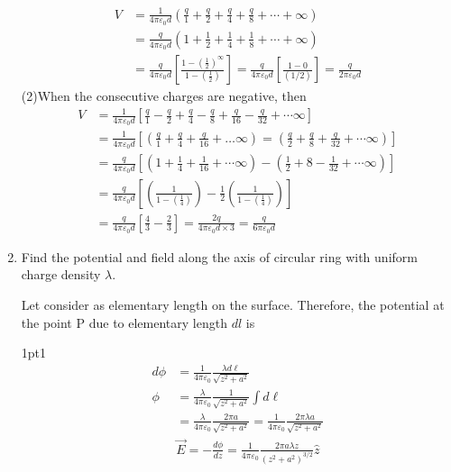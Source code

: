\begin{enumerate}[label=\color{ocre}\textbf{\arabic*.}]
\begin{answer}
		\begin{align*}
		V &=\frac{1}{4 \pi \varepsilon_{0} d}\left(\frac{q}{1}+\frac{q}{2}+\frac{q}{4}+\frac{q}{8}+\cdots+\infty\right) \\
		&=\frac{q}{4 \pi \varepsilon_{0} d}\left(1+\frac{1}{2}+\frac{1}{4}+\frac{1}{8}+\cdots+\infty\right) \\
		&=\frac{q}{4 \pi \varepsilon_{0} d}\left[\frac{1-\left(\frac{1}{2}\right)^{\infty}}{1-\left(\frac{1}{2}\right)}\right]=\frac{q}{4 \pi \varepsilon_{0} d}\left[\frac{1-0}{\left(1/2\right)}\right]=\frac{q}{2 \pi \varepsilon_{0} d}
		\end{align*}
		(2)When the consecutive charges are negative, then
		\begin{align*}
		V &=\frac{1}{4 \pi \varepsilon_{0} d}\left[\frac{q}{1}-\frac{q}{2}+\frac{q}{4}-\frac{q}{8}+\frac{q}{16}-\frac{q}{32}+\cdots \infty\right] \\
		&=\frac{1}{4 \pi \varepsilon_{0} d}\left[\left(\frac{q}{1}+\frac{q}{4}+\frac{q}{16}+\ldots \infty\right)=\left(\frac{q}{2}+\frac{q}{8}+\frac{q}{32}+\cdots \infty\right)\right] \\
		&=\frac{q}{4 \pi \varepsilon_{0} d}\left[\left(1+\frac{1}{4}+\frac{1}{16}+\cdots \infty\right)-\left(\frac{1}{2}+8-\frac{1}{32}+\cdots \infty\right)\right] \\
		&=\frac{q}{4 \pi \varepsilon_{0} d}\left[\left(\frac{1}{1-\left(\frac{1}{4}\right)}\right)-\frac{1}{2}\left(\frac{1}{1-\left(\frac{1}{4}\right)}\right)\right] \\
		&=\frac{q}{4 \pi \varepsilon_{0} d}\left[\frac{4}{3}-\frac{2}{3}\right]=\frac{2 q}{4 \pi \varepsilon_{0} d \times 3}=\frac{q}{6 \pi \varepsilon_{0} d}
		\end{align*}
	\end{answer}
	\item Find the potential and field along the axis of circular ring with uniform charge density $\lambda$.
	
	
	
	\opencutright
	\renewcommand\windowpagestuff{
		\centering\texttt{[image: potential pset-3-3]}}
	\begin{answer}
		Let consider as elementary length on the surface.
		Therefore, the potential at the point $\mathrm{P}$ due to elementary length $d l$ is
		\begin{cutout}{1}{\dimexpr\linewidth-6cm\relax}{1pt}{1}
			\begin{align*}
			d \phi&=\frac{1}{4 \pi \varepsilon_{0}} \frac{\lambda d \ell}{\sqrt{z^{2}+a^{2}}} \\
			\phi&=\frac{\lambda}{4 \pi \varepsilon_{0}} \frac{1}{\sqrt{z^{2}+a^{2}}} \int d \ell\\
			&=\frac{\lambda}{4 \pi \varepsilon_{0}} \frac{2 \pi a}{\sqrt{z^{2}+a^{2}}}=\frac{1}{4 \pi \varepsilon_{0}} \frac{2 \pi \lambda a}{\sqrt{z^{2}+a^{2}}}\\
			&\vec{E}=-\frac{d \phi}{d z}=\frac{1}{4 \pi \varepsilon_{0}} \frac{2 \pi a \lambda z}{\left(z^{2}+a^{2}\right)^{3 / 2}} \hat{z}
			\end{align*}
		\end{cutout}
		

\end{answer}
\end{enumerate}

